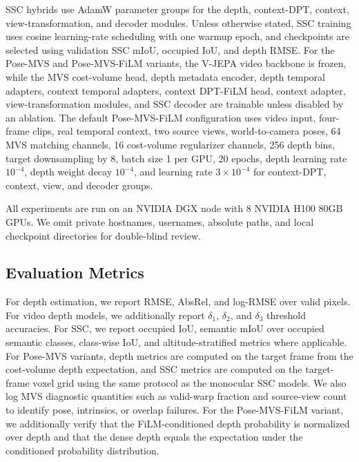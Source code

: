 SSC hybrids use AdamW parameter groups for the depth, context-DPT, context, view-transformation, and decoder modules. 
Unless otherwise stated, SSC training uses cosine learning-rate scheduling with one warmup epoch, and checkpoints are selected using validation SSC mIoU, occupied IoU, and depth RMSE. 
For the Pose-MVS and Pose-MVS-FiLM variants, the V-JEPA video backbone is frozen, while the MVS cost-volume head, depth metadata encoder, depth temporal adapters, context temporal adapters, context DPT-FiLM head, context adapter, view-transformation modules, and SSC decoder are trainable unless disabled by an ablation. 
The default Pose-MVS-FiLM configuration uses video input, four-frame clips, real temporal context, two source views, world-to-camera poses, 64 MVS matching channels, 16 cost-volume regularizer channels, 256 depth bins, target downsampling by 8, batch size 1 per GPU, 20 epochs, depth learning rate $10^{-4}$, depth weight decay $10^{-4}$, and learning rate $3\times10^{-4}$ for context-DPT, context, view, and decoder groups.

All experiments are run on an NVIDIA DGX node with 8 NVIDIA H100 80GB GPUs. 
We omit private hostnames, usernames, absolute paths, and local checkpoint directories for double-blind review.

\subsection{Evaluation Metrics}
For depth estimation, we report RMSE, AbsRel, and log-RMSE over valid pixels. 
For video depth models, we additionally report $\delta_1$, $\delta_2$, and $\delta_3$ threshold accuracies. 
For SSC, we report occupied IoU, semantic mIoU over occupied semantic classes, class-wise IoU, and altitude-stratified metrics where applicable. 
For Pose-MVS variants, depth metrics are computed on the target frame from the cost-volume depth expectation, and SSC metrics are computed on the target-frame voxel grid using the same protocol as the monocular SSC models. 
We also log MVS diagnostic quantities such as valid-warp fraction and source-view count to identify pose, intrinsics, or overlap failures. 
For the Pose-MVS-FiLM variant, we additionally verify that the FiLM-conditioned depth probability is normalized over depth and that the dense depth equals the expectation under the conditioned probability distribution.